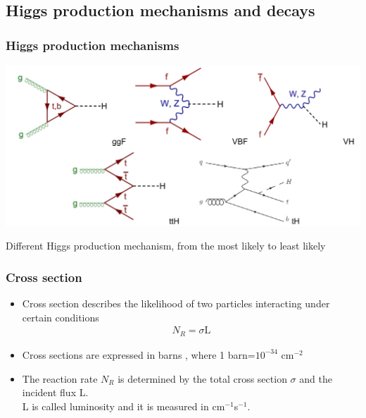 \documentclass[11pt]{beamer}
\newcommand{\nologo}{\setbeamertemplate{logo}{}}
\begin{document}
{\nologo
\begin{frame}
\subsection{Higgs production mechanisms and decays}
\frametitle{Higgs production mechanisms}

\begin{center}
\includegraphics[scale=0.4]{figures/pg.png}
\end{center}
\small{Different Higgs production mechanism, from the most likely to least likely}
\end{frame}
}

\begin{frame}
\frametitle{Cross section}
\begin{itemize}
\item Cross section describes the likelihood of two particles interacting under certain conditions\cite{1}\cite{6}
\begin{align}
N_R=\sigma \text{L}
\end{align}
\item Cross sections are expressed in barns , where 1 barn=$10^{-34}$ cm$^{-2}$ 
\item The reaction rate $N_R$ is determined by the total cross section $\sigma$ and the incident flux L.\\
L is called luminosity and it is measured in cm$^{-1}$s$^{-1}$.\cite{6}
\end{itemize}
\end{frame}
\end{document}
